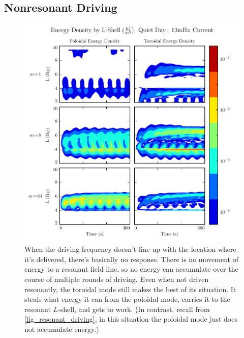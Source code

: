 
\subsection{Nonresonant Driving}

\begin{figure}[H]
    \centering
    \includegraphics[width=\textwidth]{figures/layers_13mHz_2.pdf}
    \caption[Poloidal and Toroidal Energy Distribution: Nonresonant Driving]{
      When the driving frequency doesn't line up with the location where it's delivered, there's basically no response. There is no movement of energy to a resonant field line, so no energy can accumulate over the course of multiple rounds of driving. Even when not driven resonantly, the toroidal mode still makes the best of its situation. It steals what energy it can from the poloidal mode, carries it to the resonant $L$-shell, and gets to work. (In contrast, recall from \cref{fig_resonant_driving}, in this situation the poloidal mode just does not accumulate energy.)
    }
    \label{fig_nonresonant_driving}
\end{figure}

